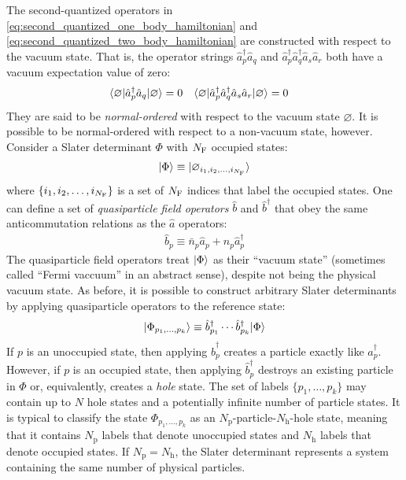 The second-quantized operators in \eqref{eq:second_quantized_one_body_hamiltonian} and \eqref{eq:second_quantized_two_body_hamiltonian} are constructed with respect to the vacuum state.  That is, the operator strings $\hat{a}_p^\dagger \hat{a}_q$ and $\hat{a}_p^\dagger \hat{a}_q^\dagger \hat{a}_s \hat{a}_r$ both have a vacuum expectation value of zero:
\begin{align*}
&\langle \varnothing | \hat{a}_p^\dagger \hat{a}_q | \varnothing \rangle = 0 &
&\langle \varnothing | \hat{a}_p^\dagger \hat{a}_q^\dagger \hat{a}_s \hat{a}_r | \varnothing \rangle = 0
\end{align*}
They are said to be \emph{normal-ordered} with respect to the vacuum state $\varnothing$.  It is possible to be normal-ordered with respect to a non-vacuum state, however.  Consider a Slater determinant $\Phi$ with $N_{\text F}$ occupied states:
\begin{align*}
  | \Phi \rangle \equiv | \varnothing_{i_1, i_2, \ldots, i_{N_{\text F}}} \rangle
\end{align*}
where $\{i_1, i_2, \ldots, i_{N_{\text F}}\}$ is a set of $N_{\text F}$ indices that label the occupied states.  One can define a set of \textit{quasiparticle field operators} $\hat b$ and $\hat b^\dagger$ that obey the same anticommutation relations as the $\hat a$ operators:
\begin{align*}
  \hat b_p \equiv \bar n_p \hat a_{p} + n_p \hat a_{p}^\dagger
\end{align*}
The quasiparticle field operators treat $| \Phi \rangle$ as their ``vacuum state'' (sometimes called ``Fermi vaccuum'' in an abstract sense), despite not being the physical vacuum state.  As before, it is possible to construct arbitrary Slater determinants by applying quasiparticle operators to the reference state:
\begin{align}
  | \Phi_{p_1, \ldots, p_k} \rangle \equiv \hat{b}^\dagger_{p_1} \cdots \hat{b}^\dagger_{p_k} | \Phi \rangle
  \label{eq:quasisd}
\end{align}
If $p$ is an unoccupied state, then applying $\hat{b}_p^\dagger$ creates a particle exactly like $\hat{a}_p^\dagger$.  However, if $p$ is an occupied state, then applying $\hat{b}_p^\dagger$ destroys an existing particle in $\Phi$ or, equivalently, creates a \textit{hole} state.  The set of labels $\{p_1, \ldots, p_k\}$ may contain up to $N$ hole states and a potentially infinite number of particle states.  It is typical to classify the state $\Phi_{p_1, \ldots, p_k}$ as an $N_{\text{p}}$-particle-$N_{\text{h}}$-hole state, meaning that it contains $N_{\text{p}}$ labels that denote unoccupied states and $N_{\text{h}}$ labels that denote occupied states.  If $N_{\text{p}} = N_{\text{h}}$, the Slater determinant represents a system containing the same number of physical particles.

